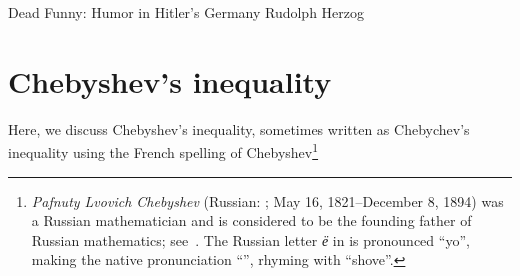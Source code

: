 \makeatletter
{}
\makeatother
\ifx\bookMode\undefined%
\fi



\ChapterPrefix{}
\ChapterGen{}

\medskip

%
{Dead Funny: Humor in Hitler's Germany}%
{Rudolph Herzog}




\section{Chebyshev's inequality}

Here, we discuss Chebyshev's inequality, sometimes written as Chebychev's
inequality using the French spelling of Chebyshev\footnote{\emph{Pafnuty
      Lvovich Chebyshev} (Russian: ; May 16, 1821--December 8, 1894) was a Russian
   mathematician and is considered to be the founding father of Russian
   mathematics; see~\cite{b-pct-99}. The Russian letter \emph{ё} in
    is pronounced ``yo'', making the native
   pronunciation ``'', rhyming with ``shove''.}


